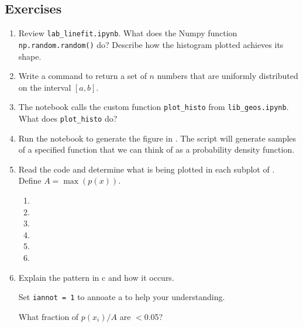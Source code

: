 \documentclass[11pt,titlepage,fleqn]{article}
\begin{document}


\pagebreak
\subsection*{Exercises}

\begin{enumerate}
\item Review \verb+lab_linefit.ipynb+. What does the Numpy function \verb+np.random.random()+ do? Describe how the histogram plotted achieves its shape.

\vertgap

\item Write a command to return a set of $n$ numbers that are uniformly distributed on the interval $[a,b]$.

\vertgap

\item The notebook calls the custom function \verb+plot_histo+ from \verb+lib_geos.ipynb+. What does \verb+plot_histo+ do?

\vertgap

\item Run the notebook to generate the figure in . The script will generate samples of a specified function that we can think of as a probability density function.

\item Read the code and determine what is being plotted in each subplot of . \\
Define $A = \max(p(x))$.
%
\begin{spacing}{2.0}
\begin{enumerate}
\item 
\item 
\item 
\item 
\item 
\item 
\end{enumerate}
\end{spacing}

\item Explain the pattern in c and how it occurs. 

Set \verb+iannot = 1+ to annoate a to help your understanding.

What fraction of $p(x_i)/A$ are $<$0.05?


\end{enumerate}
\end{document}
